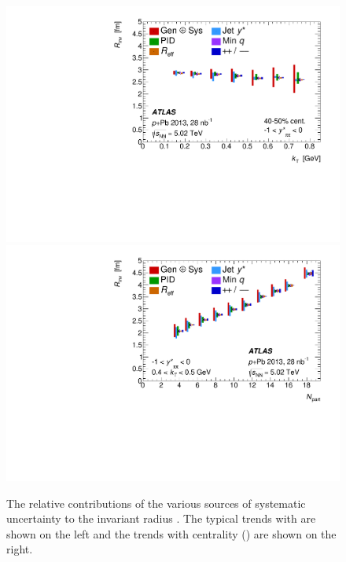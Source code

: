 \begin{center}




\end{center}

\begin{figure}[t]
\centering
\includegraphics[width=0.49\linewidth]{canqinv_R_vs_kt_systs.pdf}
\includegraphics[width=0.49\linewidth]{canqinv_R_vs_npart_systs.pdf}\\
\caption{The relative contributions of the various sources of systematic uncertainty to the invariant radius \Rinv. The typical trends with \kt are shown on the left and the trends with centrality (\Npart) are shown on the right.}
\label{fig:syst_rinv}
\end{figure}

